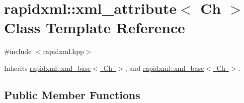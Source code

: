 \hypertarget{classrapidxml_1_1xml__attribute}{}\section{rapidxml\+:\+:xml\+\_\+attribute$<$ Ch $>$ Class Template Reference}
\label{classrapidxml_1_1xml__attribute}


{\ttfamily \#include $<$rapidxml.\+hpp$>$}



Inherits \mbox{\hyperlink{classrapidxml_1_1xml__base}{rapidxml\+::xml\+\_\+base$<$ Ch $>$}}, and \mbox{\hyperlink{classrapidxml_1_1xml__base}{rapidxml\+::xml\+\_\+base$<$ Ch $>$}}.

\subsection*{Public Member Functions}
